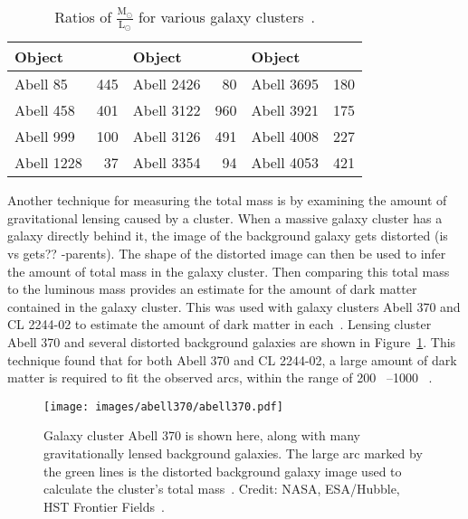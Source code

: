 \begin{table}[h]
  \centering
  \caption[Ratios of $\frac{\textrm{M}_\odot}{\textrm{L}_\odot}$ for Various Galaxy Clusters]{
    Ratios of $\frac{\textrm{M}_\odot}{\textrm{L}_\odot}$ for various galaxy clusters~\cite{cluster_ml_ratios}.
    }
  \label{tab:cluster_ml_ratios}
  \begin{tabular}{l r | l r | l r}
    Object & \mlratio{} & Object & \mlratio{} & Object & \mlratio{} \\
    \hline
    Abell   85 & 445 & Abell 2426 &  80 & Abell 3695 & 180 \\
    Abell  458 & 401 & Abell 3122 & 960 & Abell 3921 & 175 \\
    Abell  999 & 100 & Abell 3126 & 491 & Abell 4008 & 227 \\
    Abell 1228 &  37 & Abell 3354 &  94 & Abell 4053 & 421 \\
  \end{tabular}
\end{table}
    
Another technique for measuring the total mass is by examining the amount of gravitational lensing caused by a cluster.
When a massive galaxy cluster has a galaxy directly behind it, the image of the background galaxy gets distorted {\color{red}(is vs gets?? -parents)}.
The shape of the distorted image can then be used to infer the amount of total mass in the galaxy cluster.
Then comparing this total mass to the luminous mass provides an estimate for the amount of dark matter contained in the galaxy cluster.
This was used with galaxy clusters Abell 370 and CL 2244-02 to estimate the amount of dark matter in each~\cite{cluster_lensing}.
Lensing cluster Abell 370 and several distorted background galaxies are shown in Figure~\ref{fig:abell370}.
This technique found that for both Abell 370 and CL 2244-02, a large amount of dark matter is required to fit the observed arcs, within the range of \SIrange{200}{1000}{ }.
    
\begin{figure}[!ht]
  \centering
  \texttt{[image: images/abell370/abell370.pdf]}
  \caption[Gravitational Lensing in Abell 370]{
    Galaxy cluster Abell 370 is shown here, along with many gravitationally lensed background galaxies.
    The large arc marked by the green lines is the distorted background galaxy image used to calculate the cluster's total mass~\cite{cluster_lensing}.
    Credit: NASA, ESA/Hubble, HST Frontier Fields~\cite{abell370_hubble}.
  }
  \label{fig:abell370}
\end{figure}
    

